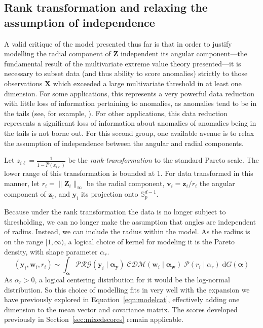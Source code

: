 \subsection{Rank transformation and relaxing the assumption of independence\label{subsec:rank}}
A valid critique of the model presented thus far is that in order to justify modelling
    the radial component of $\bm{Z}$ independent its angular component---the fundamental
    result of the multivariate extreme value theory presented---it is necessary to subset
    data (and thus ability to score anomalies) strictly to those observations $\bm{X}$ 
    which exceeded a large multivariate threshold in at least one dimension.  For some 
    applications, this represents a very powerful data reduction with little loss of 
    information pertaining to anomalies, as anomalies tend to be in the tails (see, for
    example, ).  For other
    applications, this data reduction represents a significant loss of information about 
    anomalies of anomalies being in the tails is not borne out.  For this second group, 
    one available avenue is to relax the assumption of independence between the angular 
    and radial components.

Let $z_{i\ell} = \frac{1}{1 - \hat{F}(x_{i\ell})}$ be the \emph{rank-transformation} to
    the standard Pareto scale.  The lower range of this transformation is bounded at 1.
    For data transformed in this manner, let $r_i = \lVert \bm{Z}_i\rVert_{\infty}$ be the
    radial component, $\bm{v}_i = \bm{z}_i/r_i$ the angular component of $\bm{z}_i$,
    and $\bm{y}_i$ its projection onto $\mathbb{S}_p^{d-1}$.
    
Because under the rank transformation the data is no longer subject to thresholding, 
    we can no longer make the assumption that angles are independent of radius.  Instead,
    we can include the radius within the model.  As the radius is on the range $[1,\infty)$, 
    a logical choice of kernel for modeling it is the Pareto density, with shape parameter 
    $\alpha_r$.  
    \begin{equation}
        \label{model:rank}
        (\bm{y}_i,\bm{w}_i,r_i) \sim \int_{\bm{\alpha}}
            \mathcal{PRG}(\bm{y}_i\mid\bm{\alpha}_{\bm{y}})\;
            \mathcal{CDM}(\bm{w}_i\mid\bm{\alpha}_{\bm{w}})\;
            \mathcal{P}(r_i\mid\alpha_r)\;
            \text{d}G(\bm{\alpha})
    \end{equation}
    As $\alpha_r > 0$, a logical centering distribution for it would be the log-normal distribution.
    So this choice of modelling fits in very well with the expansion we have previously explored
    in Equation~\ref{eqn:modelcat}, effectively adding one dimension to the mean vector and
    covariance matrix.  The scores developed previously in Section~\ref{sec:mixedscores} 
    remain applicable.

